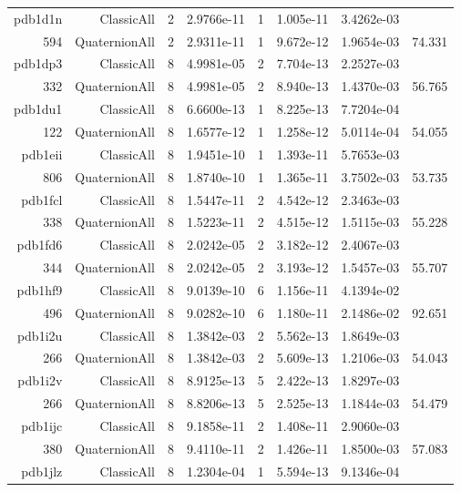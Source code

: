 \begin{xltabular}{\textwidth}{r|rcS[table-format=1.4e+2]cS[table-format=1.3e+2]S[table-format=1.4e+2]S[table-format=-1.3]}
pdb1d1n & ClassicAll & 2 & 2.9766e-11 & 1 & 1.005e-11 & 3.4262e-03 & \\
594 & QuaternionAll & 2 & 2.9311e-11 & 1 & 9.672e-12 & 1.9654e-03 & 74.331\\  \addlinespace
pdb1dp3 & ClassicAll & 8 & 4.9981e-05 & 2 & 7.704e-13 & 2.2527e-03 & \\
332 & QuaternionAll & 8 & 4.9981e-05 & 2 & 8.940e-13 & 1.4370e-03 & 56.765\\  \addlinespace
pdb1du1 & ClassicAll & 8 & 6.6600e-13 & 1 & 8.225e-13 & 7.7204e-04 & \\
122 & QuaternionAll & 8 & 1.6577e-12 & 1 & 1.258e-12 & 5.0114e-04 & 54.055\\  \addlinespace
pdb1eii & ClassicAll & 8 & 1.9451e-10 & 1 & 1.393e-11 & 5.7653e-03 & \\
806 & QuaternionAll & 8 & 1.8740e-10 & 1 & 1.365e-11 & 3.7502e-03 & 53.735\\  \addlinespace
pdb1fcl & ClassicAll & 8 & 1.5447e-11 & 2 & 4.542e-12 & 2.3463e-03 & \\
338 & QuaternionAll & 8 & 1.5223e-11 & 2 & 4.515e-12 & 1.5115e-03 & 55.228\\  \addlinespace
pdb1fd6 & ClassicAll & 8 & 2.0242e-05 & 2 & 3.182e-12 & 2.4067e-03 & \\
344 & QuaternionAll & 8 & 2.0242e-05 & 2 & 3.193e-12 & 1.5457e-03 & 55.707\\  \addlinespace
pdb1hf9 & ClassicAll & 8 & 9.0139e-10 & 6 & 1.156e-11 & 4.1394e-02 & \\
496 & QuaternionAll & 8 & 9.0282e-10 & 6 & 1.180e-11 & 2.1486e-02 & 92.651\\  \addlinespace
pdb1i2u & ClassicAll & 8 & 1.3842e-03 & 2 & 5.562e-13 & 1.8649e-03 & \\
266 & QuaternionAll & 8 & 1.3842e-03 & 2 & 5.609e-13 & 1.2106e-03 & 54.043\\  \addlinespace
pdb1i2v & ClassicAll & 8 & 8.9125e-13 & 5 & 2.422e-13 & 1.8297e-03 & \\
266 & QuaternionAll & 8 & 8.8206e-13 & 5 & 2.525e-13 & 1.1844e-03 & 54.479\\  \addlinespace
pdb1ijc & ClassicAll & 8 & 9.1858e-11 & 2 & 1.408e-11 & 2.9060e-03 & \\
380 & QuaternionAll & 8 & 9.4110e-11 & 2 & 1.426e-11 & 1.8500e-03 & 57.083\\  \addlinespace
pdb1jlz & ClassicAll & 8 & 1.2304e-04 & 1 & 5.594e-13 & 9.1346e-04 & \\

\end{xltabular}
